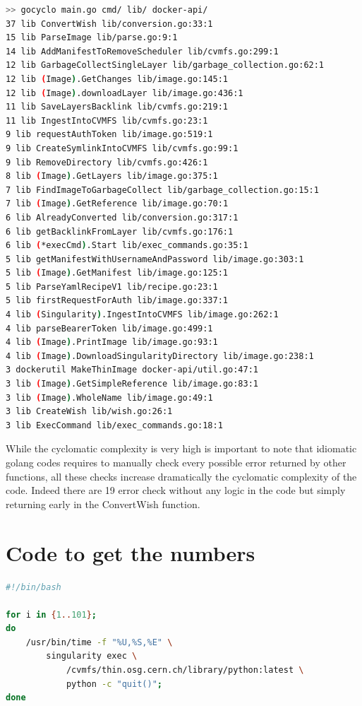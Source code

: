 \begin{lstlisting}[language=bash,
    caption={Result of the cyclomatic complexity analysis, only function with complexity greater or equal to 3 are shown},label={lst:cyclomatic}]
>> gocyclo main.go cmd/ lib/ docker-api/
37 lib ConvertWish lib/conversion.go:33:1
15 lib ParseImage lib/parse.go:9:1
14 lib AddManifestToRemoveScheduler lib/cvmfs.go:299:1
12 lib GarbageCollectSingleLayer lib/garbage_collection.go:62:1
12 lib (Image).GetChanges lib/image.go:145:1
12 lib (Image).downloadLayer lib/image.go:436:1
11 lib SaveLayersBacklink lib/cvmfs.go:219:1
11 lib IngestIntoCVMFS lib/cvmfs.go:23:1
9 lib requestAuthToken lib/image.go:519:1
9 lib CreateSymlinkIntoCVMFS lib/cvmfs.go:99:1
9 lib RemoveDirectory lib/cvmfs.go:426:1
8 lib (Image).GetLayers lib/image.go:375:1
7 lib FindImageToGarbageCollect lib/garbage_collection.go:15:1
7 lib (Image).GetReference lib/image.go:70:1
6 lib AlreadyConverted lib/conversion.go:317:1
6 lib getBacklinkFromLayer lib/cvmfs.go:176:1
6 lib (*execCmd).Start lib/exec_commands.go:35:1
5 lib getManifestWithUsernameAndPassword lib/image.go:303:1
5 lib (Image).GetManifest lib/image.go:125:1
5 lib ParseYamlRecipeV1 lib/recipe.go:23:1
5 lib firstRequestForAuth lib/image.go:337:1
4 lib (Singularity).IngestIntoCVMFS lib/image.go:262:1
4 lib parseBearerToken lib/image.go:499:1
4 lib (Image).PrintImage lib/image.go:93:1
4 lib (Image).DownloadSingularityDirectory lib/image.go:238:1
3 dockerutil MakeThinImage docker-api/util.go:47:1
3 lib (Image).GetSimpleReference lib/image.go:83:1
3 lib (Image).WholeName lib/image.go:49:1
3 lib CreateWish lib/wish.go:26:1
3 lib ExecCommand lib/exec_commands.go:18:1
\end{lstlisting}

While the cyclomatic complexity is very high is important to note that
idiomatic golang codes requires to manually check every possible error returned
by other functions, all these checks increase dramatically the cyclomatic
complexity of the code. Indeed there are 19 error check without any logic in
the code but simply returning early in the ConvertWish function.


\section{Code to get the numbers}\label{sec:benchmark-code}


\begin{lstlisting}[language=bash,
    caption={Script used to capture the startup time of singularity with image hostes in CVMFS using CVMFS cache}]
#!/bin/bash

for i in {1..101}; 
do 
    /usr/bin/time -f "%U,%S,%E" \
        singularity exec \
            /cvmfs/thin.osg.cern.ch/library/python:latest \
            python -c "quit()"; 
done
\end{lstlisting}


